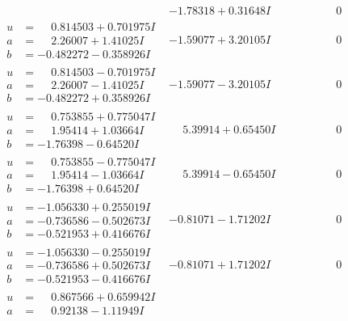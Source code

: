 \documentclass[1p]{elsarticle_modified}
\theoremstyle{definition}
\begin{document}
$$\begin{array}{c|c|c}
 & -1.78318 + 0.31648 I & \phantom{-0.000000 } 0 \\ \hline\begin{aligned}
u &= \phantom{-}0.814503 + 0.701975 I \\
a &= \phantom{-}2.26007 + 1.41025 I \\
b &= -0.482272 - 0.358926 I\end{aligned}
 & -1.59077 + 3.20105 I & \phantom{-0.000000 } 0 \\ \hline\begin{aligned}
u &= \phantom{-}0.814503 - 0.701975 I \\
a &= \phantom{-}2.26007 - 1.41025 I \\
b &= -0.482272 + 0.358926 I\end{aligned}
 & -1.59077 - 3.20105 I & \phantom{-0.000000 } 0 \\ \hline\begin{aligned}
u &= \phantom{-}0.753855 + 0.775047 I \\
a &= \phantom{-}1.95414 + 1.03664 I \\
b &= -1.76398 - 0.64520 I\end{aligned}
 & \phantom{-}5.39914 + 0.65450 I & \phantom{-0.000000 } 0 \\ \hline\begin{aligned}
u &= \phantom{-}0.753855 - 0.775047 I \\
a &= \phantom{-}1.95414 - 1.03664 I \\
b &= -1.76398 + 0.64520 I\end{aligned}
 & \phantom{-}5.39914 - 0.65450 I & \phantom{-0.000000 } 0 \\ \hline\begin{aligned}
u &= -1.056330 + 0.255019 I \\
a &= -0.736586 - 0.502673 I \\
b &= -0.521953 + 0.416676 I\end{aligned}
 & -0.81071 - 1.71202 I & \phantom{-0.000000 } 0 \\ \hline\begin{aligned}
u &= -1.056330 - 0.255019 I \\
a &= -0.736586 + 0.502673 I \\
b &= -0.521953 - 0.416676 I\end{aligned}
 & -0.81071 + 1.71202 I & \phantom{-0.000000 } 0 \\ \hline\begin{aligned}
u &= \phantom{-}0.867566 + 0.659942 I \\
a &= \phantom{-}0.92138 - 1.11949 I \\

\end{aligned}
\end{array}$$
\end{document}
